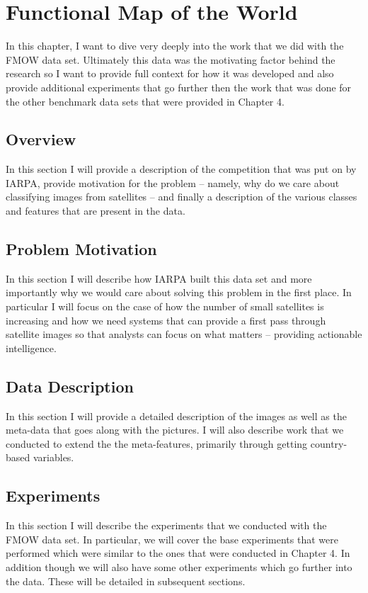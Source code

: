 \documentclass[../thesis.tex]{subfiles}
\begin{document}
\chapter{Functional Map of the World}
In this chapter, I want to dive very deeply into the work that we did with the FMOW data set. Ultimately this data was the motivating factor behind the research so I want to provide full context for how it was developed and also provide additional experiments that go further then the work that was done for the other benchmark data sets that were provided in Chapter 4.

\section{Overview}
In this section I will provide a description of the competition that was put on by IARPA, provide motivation for the problem -- namely, why do we care about classifying images from satellites -- and finally a description of the various classes and features that are present in the data.

\section{Problem Motivation}
In this section I will describe how IARPA built this data set and more importantly why we would care about solving this problem in the first place. In particular I will focus on the case of how the number of small satellites is increasing and how we need systems that can provide a first pass through satellite images so that analysts can focus on what matters -- providing actionable intelligence.

\section{Data Description}
In this section I will provide a detailed description of the images as well as the meta-data that goes along with the pictures. I will also describe work that we conducted to extend the the meta-features, primarily through getting country-based variables. 

\section{Experiments}
In this section I will describe the experiments that we conducted with the FMOW data set. In particular, we will cover the base experiments that were performed which were similar to the ones that were conducted in Chapter 4. In addition though we will also have some other experiments which go further into the data. These will be detailed in subsequent sections.
\end{document}
